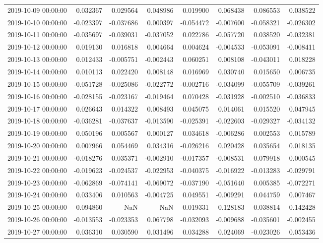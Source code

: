 \begin{tabular}{lrrrrrrr}
2019-10-09 00:00:00 & 0.032367 & 0.029564 & 0.048986 & 0.019900 & 0.068438 & 0.086553 & 0.038522 \\
2019-10-10 00:00:00 & -0.023397 & -0.037686 & 0.000397 & -0.054472 & -0.007600 & -0.058321 & -0.026302 \\
2019-10-11 00:00:00 & -0.035697 & -0.039031 & -0.037052 & 0.022786 & -0.057720 & 0.038520 & -0.032381 \\
2019-10-12 00:00:00 & 0.019130 & 0.016818 & 0.004664 & 0.004624 & -0.004533 & -0.053091 & -0.008411 \\
2019-10-13 00:00:00 & 0.012433 & -0.005751 & -0.002443 & 0.060251 & 0.008108 & -0.043011 & 0.018228 \\
2019-10-14 00:00:00 & 0.010113 & 0.022420 & 0.008148 & 0.016969 & 0.030740 & 0.015650 & 0.006735 \\
2019-10-15 00:00:00 & -0.051728 & -0.025086 & -0.022772 & -0.002716 & -0.034099 & -0.055709 & -0.039261 \\
2019-10-16 00:00:00 & -0.028155 & -0.023167 & -0.019464 & 0.070428 & -0.031928 & -0.002510 & -0.036833 \\
2019-10-17 00:00:00 & 0.026643 & 0.014322 & 0.008493 & 0.045075 & 0.014061 & 0.015520 & 0.047945 \\
2019-10-18 00:00:00 & -0.036281 & -0.037637 & -0.013590 & -0.025391 & -0.022603 & -0.029327 & -0.034132 \\
2019-10-19 00:00:00 & 0.050196 & 0.005567 & 0.000127 & 0.034618 & -0.006286 & 0.002553 & 0.015789 \\
2019-10-20 00:00:00 & 0.007966 & 0.054469 & 0.034316 & -0.026216 & 0.020428 & 0.035654 & 0.018135 \\
2019-10-21 00:00:00 & -0.018276 & 0.035371 & -0.002910 & -0.017357 & -0.008531 & 0.079918 & 0.000545 \\
2019-10-22 00:00:00 & -0.019623 & -0.024537 & -0.022953 & -0.040375 & -0.016922 & -0.013283 & -0.029791 \\
2019-10-23 00:00:00 & -0.062869 & -0.074141 & -0.069072 & -0.037190 & -0.051640 & 0.005385 & -0.072271 \\
2019-10-24 00:00:00 & 0.033406 & 0.010563 & -0.004725 & 0.049551 & -0.009291 & 0.044759 & 0.007467 \\
2019-10-25 00:00:00 & 0.094860 & NaN & NaN & 0.019331 & 0.128183 & 0.038814 & 0.142428 \\
2019-10-26 00:00:00 & -0.013553 & -0.023353 & 0.067798 & -0.032093 & -0.009688 & -0.035601 & -0.002455 \\
2019-10-27 00:00:00 & 0.036310 & 0.030590 & 0.031496 & 0.034288 & 0.024069 & -0.023026 & 0.053436 \\

\end{tabular}
